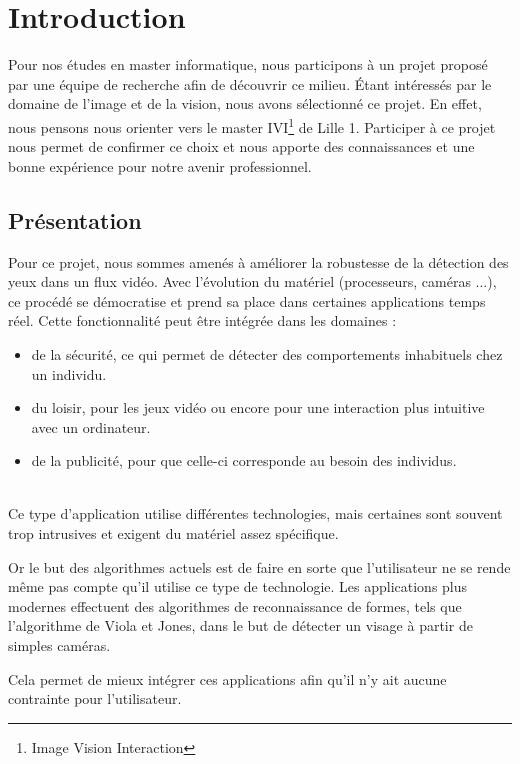 \section{Introduction}

Pour nos études en master informatique, nous participons à un projet proposé par une 
équipe de recherche afin de découvrir ce milieu. 
Étant intéressés par le domaine de l'image et de la vision, nous avons sélectionné ce projet. 
En effet, nous pensons nous orienter vers le master IVI\footnote{Image Vision Interaction} de 
Lille 1. Participer à ce projet nous permet de confirmer ce choix et nous apporte des 
connaissances et une bonne expérience pour notre avenir professionnel.\\

\subsection{Présentation}
Pour ce projet, nous sommes amenés à améliorer la robustesse de la détection des yeux dans un flux vidéo.
Avec l'évolution du matériel (processeurs, caméras ...), ce procédé se démocratise et prend sa place 
dans certaines applications temps réel. Cette fonctionnalité peut être intégrée dans les domaines : 
\begin{itemize}
 \item de la sécurité, ce qui permet de détecter des comportements inhabituels chez un individu.%
 \item du loisir, pour les jeux vidéo ou encore pour une interaction plus intuitive avec un ordinateur.
 \item de la publicité, pour que celle-ci corresponde au besoin des individus. 
\end{itemize}
\ \\
Ce type d'application utilise différentes technologies, mais certaines sont souvent trop intrusives 
et exigent du matériel assez spécifique. 

Or le but des algorithmes actuels
est de faire en sorte que l'utilisateur ne se rende même pas compte qu'il utilise ce type de technologie. Les applications plus 
modernes effectuent des algorithmes de reconnaissance de formes, tels que l'algorithme de Viola et Jones, dans 
le but de détecter un visage à partir de simples caméras. 


Cela permet de mieux intégrer ces applications 
afin qu'il n'y ait aucune contrainte pour l'utilisateur.\\

